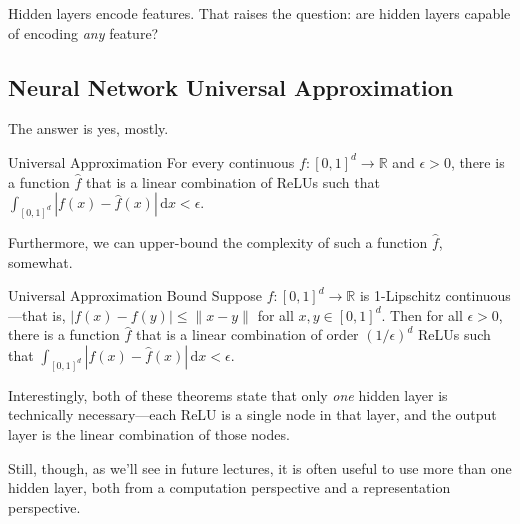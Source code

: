 Hidden layers encode features.
That raises the question:
are hidden layers capable of encoding \emph{any} feature?

\subsection{Neural Network Universal Approximation}

The answer is yes, mostly.

\begin{theorem}{Universal Approximation}
    For every continuous $f \colon [0, 1]^d \to \mathbb{R}$
    and $\epsilon > 0$, there is a function $\hat{f}$
    that is a linear combination of ReLUs such that
    $\int_{[0, 1]^d} |f(x) - \hat{f}(x)| \, \mathrm{d}x < \epsilon$.
\end{theorem}

Furthermore, we can upper-bound
the complexity of such a function $\hat{f}$, somewhat.

\begin{theorem}{Universal Approximation Bound}
    Suppose $f \colon [0, 1]^d \to \mathbb{R}$
    is 1-Lipschitz continuous---that is,
    $|f(x) - f(y)| \leq \|x - y\|$
    for all $x, y \in [0, 1]^d$.
    Then for all $\epsilon > 0$, there is a function $\hat{f}$
    that is a linear combination of order $(1/\epsilon)^d$ ReLUs such that
    $\int_{[0, 1]^d} |f(x) - \hat{f}(x)| \, \mathrm{d}x < \epsilon$.
\end{theorem}

Interestingly, both of these theorems state
that only \emph{one} hidden layer is technically necessary---each
ReLU is a single node in that layer,
and the output layer is the linear combination of those nodes.

Still, though, as we'll see in future lectures,
it is often useful to use more than one hidden layer,
both from a computation perspective and a representation perspective.


